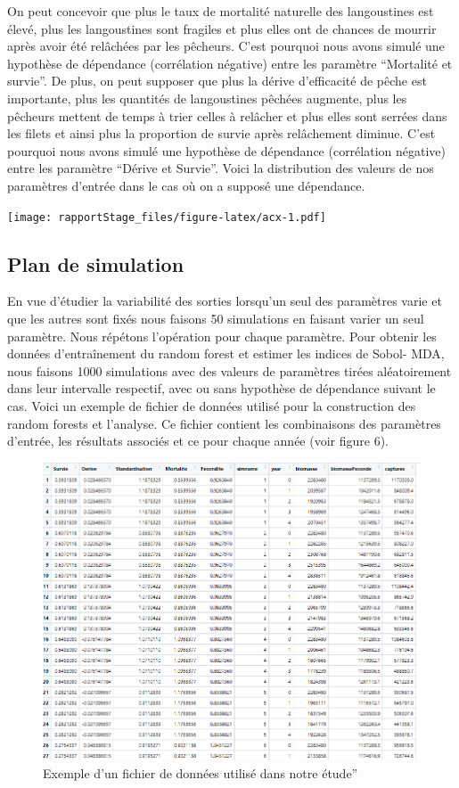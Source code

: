 \documentclass[
]{article}
\begin{document}
On peut concevoir que plus le taux de mortalité naturelle des
langoustines est élevé, plus les langoustines sont fragiles et plus
elles ont de chances de mourrir après avoir été relâchées par les
pêcheurs. C'est pourquoi nous avons simulé une hypothèse de dépendance
(corrélation négative) entre les paramètre ``Mortalité et survie''. De
plus, on peut supposer que plus la dérive d'efficacité de pêche est
importante, plus les quantités de langoustines pêchées augmente, plus
les pêcheurs mettent de temps à trier celles à relâcher et plus elles
sont serrées dans les filets et ainsi plus la proportion de survie après
relâchement diminue. C'est pourquoi nous avons simulé une hypothèse de
dépendance (corrélation négative) entre les paramètre ``Dérive et
Survie''. Voici la distribution des valeurs de nos paramètres d'entrée
dans le cas où on a supposé une dépendance.

\texttt{[image: rapportStage\_files/figure-latex/acx-1.pdf]}

\hypertarget{plan-de-simulation}{%
\subsection{Plan de simulation}\label{plan-de-simulation}}

En vue d'étudier la variabilité des sorties lorsqu'un seul des
paramètres varie et que les autres sont fixés nous faisons 50
simulations en faisant varier un seul paramètre. Nous répétons
l'opération pour chaque paramètre. Pour obtenir les données
d'entraînement du random forest et estimer les indices de Sobol- MDA,
nous faisons 1000 simulations avec des valeurs de paramètres tirées
aléatoirement dans leur intervalle respectif, avec ou sans hypothèse de
dépendance suivant le cas. Voici un exemple de fichier de données
utilisé pour la construction des random forests et l'analyse. Ce fichier
contient les combinaisons des paramètres d'entrée, les résultats
associés et ce pour chaque année (voir figure 6).

\begin{figure}
\centering
\includegraphics{exDonnees.png}
\caption{Exemple d'un fichier de données utilisé dans notre étude''}
\end{figure}
\end{document}

